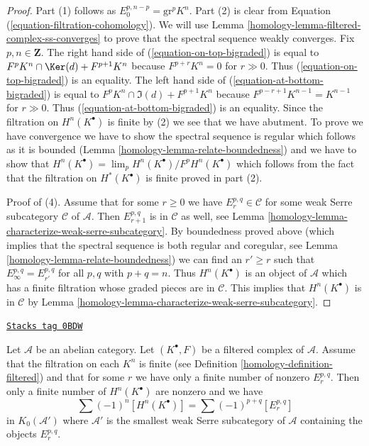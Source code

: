 \begin{proof}

Part (1) follows as $E_0^{p, n - p} = \text{gr}^p K^n$.
Part (2) is clear from Equation (\ref{equation-filtration-cohomology}).
We will use Lemma \ref{homology-lemma-filtered-complex-ss-converges} to prove
that the spectral sequence weakly converges. Fix $p, n \in \mathbf{Z}$.
The right hand side of (\ref{equation-on-top-bigraded})
is equal to $F^pK^n \cap \Ker(d) + F^{p + 1}K^n$ because
$F^{p + r}K^n = 0$ for $r \gg 0$. Thus (\ref{equation-on-top-bigraded})
is an equality. The left hand side of (\ref{equation-at-bottom-bigraded})
is equal to $F^pK^n \cap \Im(d) + F^{p + 1}K^n$ because
$F^{p - r + 1}K^{n - 1} = K^{n - 1}$ for $r \gg 0$.
Thus (\ref{equation-at-bottom-bigraded}) is an equality. Since the filtration
on $H^n(K^\bullet)$ is finite by (2) we see that we have abutment.
To prove we have convergence we have to show the spectral sequence is
regular which follows as it is bounded
(Lemma \ref{homology-lemma-relate-boundedness}) and we have
to show that $H^n(K^\bullet) = \lim_p H^n(K^\bullet)/F^pH^n(K^\bullet)$
which follows from the fact that the filtration on $H^*(K^\bullet)$
is finite proved in part (2).

\medskip\noindent
Proof of (4). Assume that for some $r \geq 0$ we have
$E_r^{p, q} \in \mathcal{C}$ for some weak Serre subcategory
$\mathcal{C}$ of $\mathcal{A}$. Then $E_{r + 1}^{p, q}$ is
in $\mathcal{C}$ as well, see
Lemma \ref{homology-lemma-characterize-weak-serre-subcategory}.
By boundedness proved above (which implies that the spectral sequence
is both regular and coregular, see Lemma \ref{homology-lemma-relate-boundedness})
we can find an $r' \geq r$ such that $E_\infty^{p, q} = E_{r'}^{p, q}$
for all $p, q$ with $p + q = n$. Thus $H^n(K^\bullet)$ is an object
of $\mathcal{A}$ which has a finite filtration whose graded pieces
are in $\mathcal{C}$. This implies that $H^n(K^\bullet)$ is in $\mathcal{C}$
by Lemma \ref{homology-lemma-characterize-weak-serre-subcategory}.
\end{proof}

\begin{lemma}
\label{homology-lemma-biregular-ss-relation-in-K0}
\href{https://stacks.math.columbia.edu/tag/0BDW}{\texttt{Stacks tag 0BDW}}

Let $\mathcal{A}$ be an abelian category. Let $(K^\bullet, F)$ be a
filtered complex of $\mathcal{A}$. Assume that the filtration on each $K^n$
is finite (see Definition \ref{homology-definition-filtered}) and that for some
$r$ we have only a finite number of nonzero $E_r^{p, q}$. Then
only a finite number of $H^n(K^\bullet)$ are nonzero and we have
$$
\sum (-1)^n[H^n(K^\bullet)] = \sum (-1)^{p + q} [E_r^{p, q}]
$$
in $K_0(\mathcal{A}')$ where $\mathcal{A}'$ is the smallest weak
Serre subcategory of $\mathcal{A}$ containing the objects
$E_r^{p, q}$.
\end{lemma}

